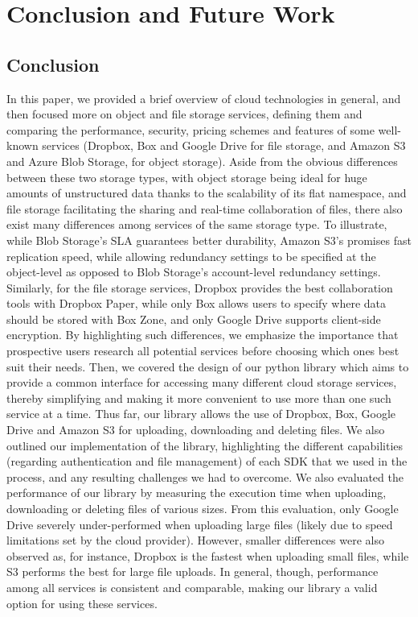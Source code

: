 \chapter{Conclusion and Future Work}\label{ch:conclusion}

\section{Conclusion}
In this paper, we provided a brief overview of cloud technologies in general, and then focused more on object and file storage services, defining them and comparing the performance, security, pricing schemes and features of some well-known services (Dropbox, Box and Google Drive for file storage, and Amazon S3 and Azure Blob Storage, for object storage). Aside from the obvious differences between these two storage types, with object storage being ideal for huge amounts of unstructured data thanks to the scalability of its flat namespace, and file storage facilitating the sharing and real-time collaboration of files, there also exist many differences among  services of the same storage type. To illustrate, while Blob Storage's SLA guarantees better durability, Amazon S3's promises fast replication speed, while allowing redundancy settings to be specified at the object-level as opposed to  Blob Storage's account-level redundancy settings. Similarly, for the file storage services, Dropbox provides the best collaboration tools with Dropbox Paper, while only Box allows users to specify where data should be stored with Box Zone, and only Google Drive supports client-side encryption.  By highlighting such differences, we emphasize the importance that prospective users research all potential services before choosing which ones best suit their needs. Then, we covered the design of our python library which aims to provide a common interface for accessing many different cloud storage services, thereby simplifying and making it more convenient to use more than one such service at a time. Thus far, our library allows the use of Dropbox, Box, Google Drive and Amazon S3 for uploading, downloading and deleting files. We also outlined our implementation of the library, highlighting the different capabilities (regarding authentication and file management) of each SDK that we used in the process, and any resulting challenges we had to overcome. We also evaluated the performance of our library by measuring the execution time when uploading, downloading or deleting files of various sizes. From this evaluation, only Google Drive severely under-performed when uploading large files (likely due to speed limitations set by the cloud provider). However, smaller differences were also observed as, for instance, Dropbox is the fastest when uploading small files, while S3 performs the best for large file uploads. In general, though, performance among all services is consistent and comparable, making our library a valid option for using these services. 

